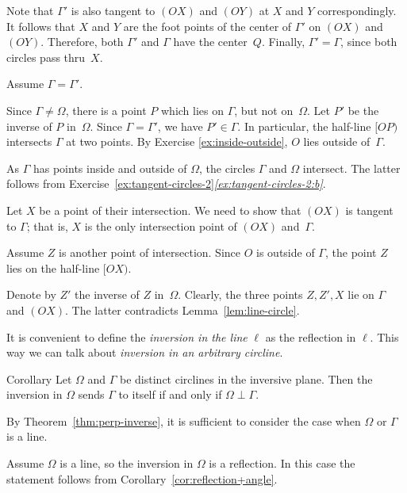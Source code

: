 Note that $\Gamma'$ is also tangent to $(OX)$ and $(OY)$ at $X$ and $Y$ correspondingly. 
It follows that $X$ and $Y$ are the foot points of the center of $\Gamma'$ on $(OX)$ and $(OY)$.
Therefore, both $\Gamma'$ and $\Gamma$ have the center~$Q$.
Finally, $\Gamma'=\Gamma$, since both circles pass thru~$X$.

Assume $\Gamma=\Gamma'$.

Since $\Gamma\ne \Omega$, there is a point $P$ which lies on $\Gamma$, but not on~$\Omega$.
Let $P'$ be the inverse of $P$ in~$\Omega$.
Since $\Gamma=\Gamma'$, we have $P'\in \Gamma$.
In particular, the half-line $[OP)$ intersects $\Gamma$ at two points.
By Exercise \ref{ex:inside-outside}, 
 $O$ lies outside of~$\Gamma$.

As $\Gamma$ has points inside and outside of $\Omega$,
the circles $\Gamma$ and $\Omega$ intersect.
The latter follows from Exercise~\ref{ex:tangent-circles-2}\textit{\ref{ex:tangent-circles-2:b}}.

Let $X$ be a point of their intersection.
We need to show that $(OX)$ is tangent to $\Gamma$;
that is, $X$ is the only intersection point of $(OX)$ and~$\Gamma$.

Assume $Z$ is another point of intersection.
Since $O$ is outside of $\Gamma$, 
the point $Z$ lies on the half-line $[OX)$.

Denote by $Z'$ the inverse of $Z$ in~$\Omega$.
Clearly, the three points $Z, Z', X$ lie on $\Gamma$ and $(OX)$.
The latter  contradicts Lemma~\ref{lem:line-circle}.
\qeds 

It is convenient to define the 
\emph{inversion in the line} $\ell$
as the reflection in $\ell$.
This way we can talk about \emph{inversion in an arbitrary circline}.


\begin{thm}{Corollary}\label{cor:perp-inverse-clines}
Let $\Omega$  and $\Gamma$ be distinct circlines in the inversive plane.
Then
the inversion in $\Omega$ sends $\Gamma$ to itself if and only if $\Omega\perp\Gamma$.
\end{thm}

By Theorem~\ref{thm:perp-inverse}, it is sufficient to consider the case when $\Omega$ or $\Gamma$ is a line.

Assume $\Omega$ is a line, so the inversion in $\Omega$ is a reflection.
In this case the statement follows from Corollary~\ref{cor:reflection+angle}.

